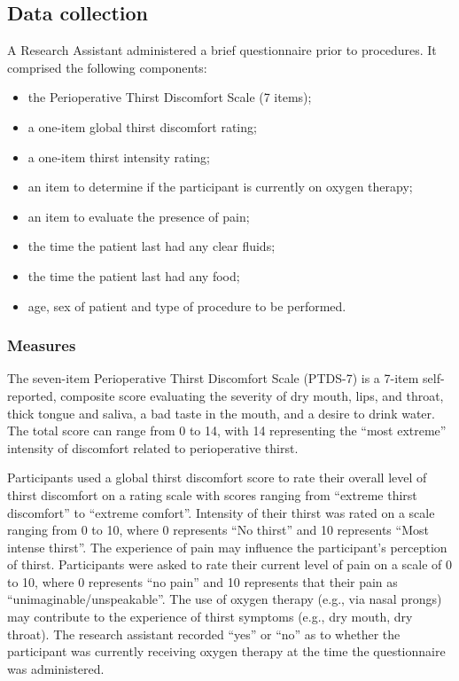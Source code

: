 \documentclass[12pt,twoside,]{pinp}
\providecommand{\tightlist}{%
  \setlength{\itemsep}{0pt}\setlength{\parskip}{0pt}}
\begin{document}
\hypertarget{data-collection}{%
\subsection{Data collection}\label{data-collection}}

A Research Assistant administered a brief questionnaire prior to
procedures. It comprised the following components:

\begin{itemize}
\tightlist
\item
  the Perioperative Thirst Discomfort Scale (7 items);
\item
  a one-item global thirst discomfort rating;
\item
  a one-item thirst intensity rating;
\item
  an item to determine if the participant is currently on oxygen
  therapy;
\item
  an item to evaluate the presence of pain;
\item
  the time the patient last had any clear fluids;
\item
  the time the patient last had any food;
\item
  age, sex of patient and type of procedure to be performed.
\end{itemize}

\hypertarget{measures}{%
\subsubsection{Measures}\label{measures}}

The seven-item Perioperative Thirst Discomfort Scale (PTDS-7) is a
7-item self-reported, composite score evaluating the severity of dry
mouth, lips, and throat, thick tongue and saliva, a bad taste in the
mouth, and a desire to drink water.\citep{Martins_2017} The total score
can range from 0 to 14, with 14 representing the ``most extreme''
intensity of discomfort related to perioperative
thirst.\citep{Martins_2017}

Participants used a global thirst discomfort score to rate their overall
level of thirst discomfort on a rating scale with scores ranging from
``extreme thirst discomfort'' to ``extreme comfort''. Intensity of their
thirst was rated on a scale ranging from 0 to 10, where 0 represents
``No thirst'' and 10 represents ``Most intense thirst''. The experience
of pain may influence the participant's perception of
thirst.\citep{Pierotti_2018} Participants were asked to rate their
current level of pain on a scale of 0 to 10, where 0 represents ``no
pain'' and 10 represents that their pain as
``unimaginable/unspeakable''. The use of oxygen therapy (e.g., via nasal
prongs) may contribute to the experience of thirst symptoms (e.g., dry
mouth, dry throat).\citep{conchon2015perioperative} The research
assistant recorded ``yes'' or ``no'' as to whether the participant was
currently receiving oxygen therapy at the time the questionnaire was
administered.
\end{document}
